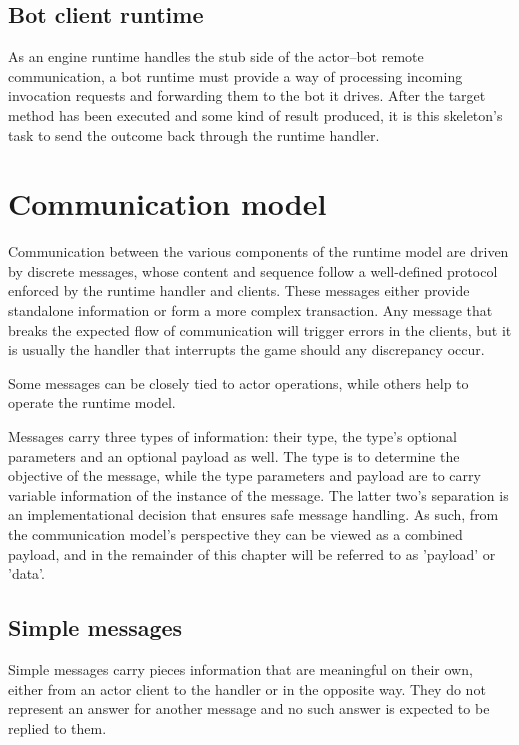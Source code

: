 \documentclass[11pt,a4paper,oneside]{report}
\begin{document}
		\subsection*{Bot client runtime}
		
		As an engine runtime handles the stub side of the actor--bot remote communication, a bot runtime must provide a way of processing incoming invocation requests and forwarding them to the bot it drives. After the target method has been executed and some kind of result produced, it is this skeleton's task to send the outcome back through the runtime handler.

	\section{Communication model}

		Communication between the various components of the runtime model are driven by discrete messages, whose content and sequence follow a well-defined protocol enforced by the runtime handler and clients. These messages either provide standalone information or form a more complex transaction. Any message that breaks the expected flow of communication will trigger errors in the clients, but it is usually the handler that interrupts the game should any discrepancy occur.
		
		Some messages can be closely tied to actor operations, while others help to operate the runtime model. 

		Messages carry three types of information: their type, the type's optional parameters and an optional payload as well. The type is to determine the objective of the message, while the type parameters and payload are to carry variable information of the instance of the message. The latter two's separation is an implementational decision that ensures safe message handling. As such, from the communication model's perspective they can be viewed as a combined payload, and in the remainder of this chapter will be referred to as 'payload' or 'data'.  

		\subsection*{Simple messages}
		
		Simple messages carry pieces information that are meaningful on their own, either from an actor client to the handler or in the opposite way. They do not represent an answer for another message and no such answer is expected to be replied to them.
		
\end{document}
